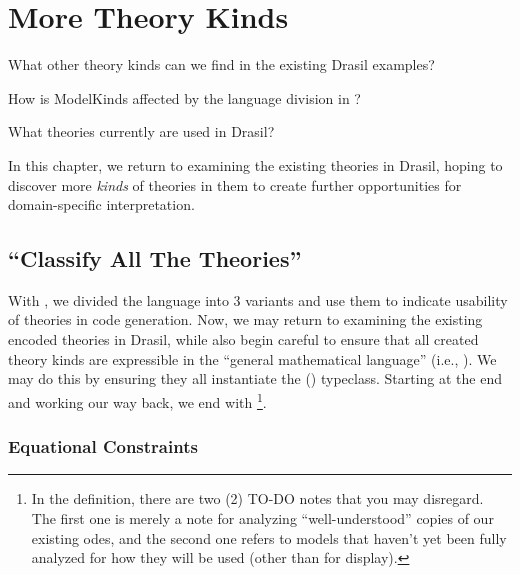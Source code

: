 \chapter{More Theory Kinds}
\label{chap:more-theory-kinds}

\begin{writingdirectives}
	\item What other theory kinds can we find in the existing Drasil examples?
	\item How is ModelKinds affected by the language division in
	?
	\item What theories currently are used in Drasil?
\end{writingdirectives}

In this chapter, we return to examining the existing theories in Drasil, hoping
to discover more \textit{kinds} of theories in them to create further
opportunities for domain-specific interpretation.

\section{\textquotedblleft{}Classify All The Theories\textquotedblright{}}
\label{chap:more-theory-kinds:sec:classify-all-the-theories}

With , we divided the \Expr{} language into 3 variants
and use them to indicate usability of theories in code generation. Now, we may
return to examining the existing encoded theories in Drasil, while also begin
careful to ensure that all created theory kinds are expressible in the ``general
mathematical language'' (i.e., \ModelExpr{}). We may do this by ensuring they
all instantiate the \Express{} () typeclass. Starting
at the end and working our way back, we end with
\footnote{In the 
	definition, there are two (2) TO-DO notes that you may disregard. The first one
	is merely a note for analyzing ``well-understood'' copies of our existing
	\acsp{ode}, and the second one refers to models that haven't yet been fully
	analyzed for how they will be used (other than for display).}.

\currentModelKindsHaskell{}

\subsection{Equational Constraints}
\label{chap:more-theory-kinds:sec:classify-all-the-theories:subsec:equational-constraints}

